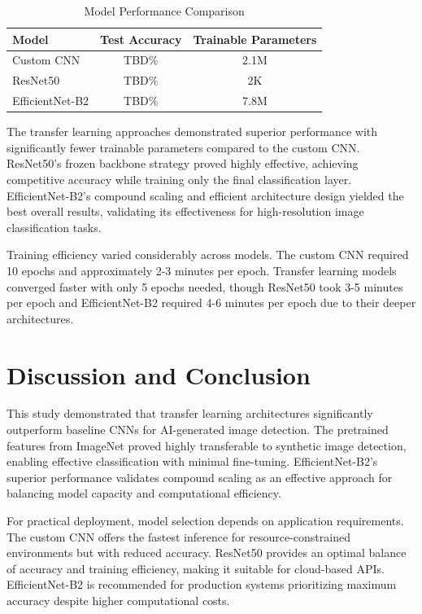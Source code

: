 \documentclass[man,12pt,letterpaper,donotrepeattitle,floatsintext]{apa7}
\begin{document}
\processdelayedfloats
\begin{table}[!htbp]
\centering
\caption{Model Performance Comparison}
\label{tab:results}
\begin{tabular}{lcc}
\hline
\textbf{Model} & \textbf{Test Accuracy} & \textbf{Trainable Parameters} \\
\hline
Custom CNN & TBD\% & 2.1M \\
ResNet50 & TBD\% & 2K \\
EfficientNet-B2 & TBD\% & 7.8M \\
\hline
\end{tabular}
\end{table}

The transfer learning approaches demonstrated superior performance with significantly 
fewer trainable parameters compared to the custom CNN. ResNet50's frozen backbone strategy 
proved highly effective, achieving competitive accuracy while training only the final 
classification layer. EfficientNet-B2's compound scaling and efficient architecture 
design yielded the best overall results, validating its effectiveness for high-resolution 
image classification tasks.

Training efficiency varied considerably across models. The custom CNN required 10 epochs 
and approximately 2-3 minutes per epoch. Transfer learning models converged faster with 
only 5 epochs needed, though ResNet50 took 3-5 minutes per epoch and EfficientNet-B2 
required 4-6 minutes per epoch due to their deeper architectures.

\section{Discussion and Conclusion}
\label{conclusion}

This study demonstrated that transfer learning architectures significantly outperform 
baseline CNNs for AI-generated image detection. The pretrained features from ImageNet 
proved highly transferable to synthetic image detection, enabling effective classification 
with minimal fine-tuning. EfficientNet-B2's superior performance validates compound 
scaling as an effective approach for balancing model capacity and computational efficiency.

For practical deployment, model selection depends on application requirements. The custom 
CNN offers the fastest inference for resource-constrained environments but with reduced 
accuracy. ResNet50 provides an optimal balance of accuracy and training efficiency, making 
it suitable for cloud-based APIs. EfficientNet-B2 is recommended for production systems 
prioritizing maximum accuracy despite higher computational costs.
\end{document}
